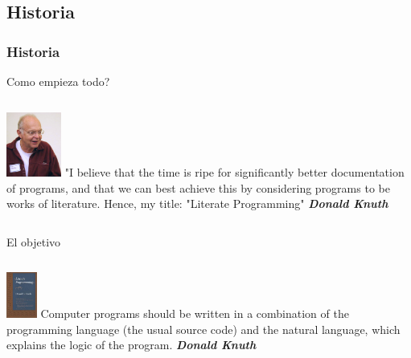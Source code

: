 \documentclass[sans serif,9pt,xcolor=dvipsnames]{beamer}%
\begin{document}
\subsection{Historia}
\begin{frame}
\frametitle{Historia}
\begin{block}{Como empieza todo?}
\begin{columns}
 \hspace{0.7cm}
\includegraphics[width=1.8cm]{imagenes/donald.jpg}
\justifying
"I believe that the time is ripe for significantly better documentation of programs, and that we can best achieve this by considering programs to be works of literature. Hence, my title: "Literate Programming" \textbf{\textit{Donald Knuth}}
\end{columns}
\end{block}

\begin{block}{El objetivo}
\begin{columns}
 \hspace{0.7cm}
\includegraphics[height=1.5cm]{imagenes/book.png} 
\justifying
Computer programs should be written in a combination of the programming language (the usual source code) and the natural language, which explains the logic of the program. \textbf{\textit{Donald Knuth}}
\end{columns}
\end{block}

\end{frame}
\end{document}
